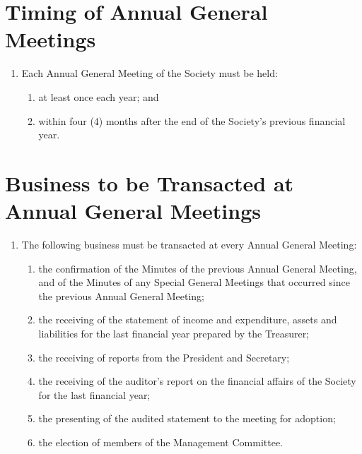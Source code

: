 \documentclass[a4paper]{article}
\begin{document}
\section{Timing of Annual General Meetings}
\begin{enumerate}
\item Each Annual General Meeting of the Society must be held:
	\begin{enumerate}
	\item at least once each year; and
	\item within four (4) months after the end of the Society's previous financial year.
	\end{enumerate}
\end{enumerate}

\section{Business to be Transacted at Annual General Meetings}
\begin{enumerate}
\item The following business must be transacted at every Annual General Meeting:
	\begin{enumerate}
	\item the confirmation of the Minutes of the previous Annual General Meeting, and of the Minutes of any Special General Meetings that occurred since the previous Annual General Meeting;
	\item the receiving of the statement of income and expenditure, assets and liabilities for the last financial year prepared by the Treasurer;
	\item the receiving of reports from the President and Secretary;
	\item the receiving of the auditor's report on the financial affairs of the Society for the last financial year;
	\item the presenting of the audited statement to the meeting for adoption;
	\item the election of members of the Management Committee.
	\end{enumerate}
\end{enumerate}
\end{document}
